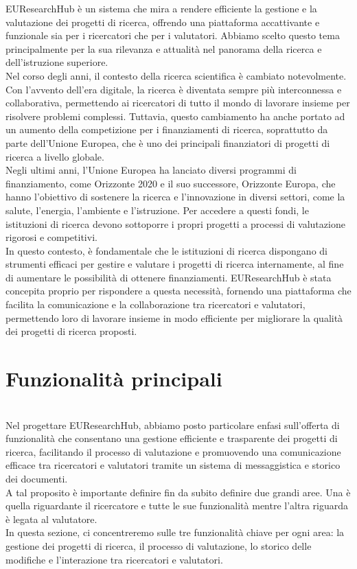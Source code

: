\documentclass{report}
\begin{document}
EUResearchHub è un sistema che mira a rendere efficiente la gestione e la valutazione dei progetti di ricerca, offrendo una piattaforma accattivante e funzionale sia per i ricercatori che per i valutatori. Abbiamo scelto questo tema principalmente per la sua rilevanza e attualità nel panorama della ricerca e dell'istruzione superiore.\\
Nel corso degli anni, il contesto della ricerca scientifica è cambiato notevolmente. Con l'avvento dell'era digitale, la ricerca è diventata sempre più interconnessa e collaborativa, permettendo ai ricercatori di tutto il mondo di lavorare insieme per risolvere problemi complessi. Tuttavia, questo cambiamento ha anche portato ad un aumento della competizione per i finanziamenti di ricerca, soprattutto da parte dell'Unione Europea, che è uno dei principali finanziatori di progetti di ricerca a livello globale.\\
Negli ultimi anni, l'Unione Europea ha lanciato diversi programmi di finanziamento, come Orizzonte 2020 e il suo successore, Orizzonte Europa, che hanno l'obiettivo di sostenere la ricerca e l'innovazione in diversi settori, come la salute, l'energia, l'ambiente e l'istruzione. Per accedere a questi fondi, le istituzioni di ricerca devono sottoporre i propri progetti a processi di valutazione rigorosi e competitivi.\\
In questo contesto, è fondamentale che le istituzioni di ricerca dispongano di strumenti efficaci per gestire e valutare i progetti di ricerca internamente, al fine di aumentare le possibilità di ottenere finanziamenti. EUResearchHub è stata concepita proprio per rispondere a questa necessità, fornendo una piattaforma che facilita la comunicazione e la collaborazione tra ricercatori e valutatori, permettendo loro di lavorare insieme in modo efficiente per migliorare la qualità dei progetti di ricerca proposti.\\


\section{Funzionalità principali}
\phantom{This text will be invisible}\\
Nel progettare EUResearchHub, abbiamo posto particolare enfasi sull'offerta di funzionalità che consentano una gestione efficiente e trasparente dei progetti di ricerca, facilitando il processo di valutazione e promuovendo una comunicazione efficace tra ricercatori e valutatori tramite un sistema di messaggistica e storico dei documenti. \\
A tal proposito è importante definire fin da subito definire due grandi aree. Una è quella riguardante il ricercatore e tutte le sue funzionalità mentre l’altra riguarda è legata al valutatore. \\
In questa sezione, ci concentreremo sulle tre funzionalità chiave per ogni area: la gestione dei progetti di ricerca, il processo di valutazione, lo storico delle modifiche e l'interazione tra ricercatori e valutatori.
\end{document}
